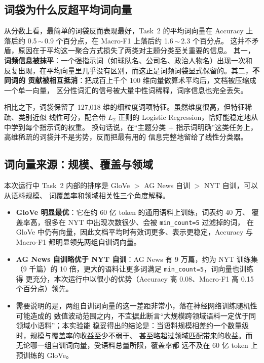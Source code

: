 \documentclass[a4paper]{article}
\begin{document}
\subsection{词袋为什么反超平均词向量}

从分数上看，最简单的词袋反而表现最好，Task~2 的平均词向量在 Accuracy 上落后约
0.5\,$\sim$\,0.9 个百分点，在 Macro-F1 上落后约 1.6\,$\sim$\,2.3 个百分点。
这并不矛盾，原因在于平均这一聚合方式损失了两类对主题分类至关重要的信息。
其一，\textbf{词频信息被抹平}：一个强指示词（如球队名、公司名、政治人物名）出现一次和
反复出现，在平均向量里几乎没有区别，而这正是词频词袋显式保留的。其二，\textbf{不同词的
贡献被相互抵消}：把成百上千个 100 维向量做算术平均后，文档被压缩成一个单一向量，
区分性词汇的信号被大量中性词稀释，词序信息也完全丢失。

相比之下，词袋保留了 127{,}018 维的细粒度词项特征。虽然维度很高，但特征稀疏、类别近似
线性可分，配合带 $L_2$ 正则的 Logistic Regression，恰好能稳定地从中学到每个指示词的权重。
换句话说，在“主题分类 + 指示词明确”这类任务上，高维稀疏的词袋并不是劣势，反而把最有用的
信息完整地留给了线性分类器。

\subsection{词向量来源：规模、覆盖与领域}

本次运行中 Task~2 内部的排序是 GloVe $>$ AG News 自训 $>$ NYT 自训，可以从语料规模、
词覆盖率和领域相关性三个角度解释。
\begin{itemize}
  \item \textbf{GloVe 明显最优}：它在约 60 亿 token 的通用语料上训练，词表约 40 万、
        覆盖率高，很多在 NYT 中出现次数很少、会被 \texttt{min\_count=5} 过滤掉的词，
        在 GloVe 中仍有向量，因此文档平均时有效词更多、表示更稳定，Accuracy 与 Macro-F1
        都明显领先两组自训词向量。
  \item \textbf{AG News 自训略优于 NYT 自训}：AG News 有 9 万篇，约为 NYT 训练集
        （9 千篇）的 10 倍，更大的语料让更多词满足 \texttt{min\_count=5}，词向量也训练得
        更充分，本次运行中以很小的优势（Accuracy 高 0.08、Macro-F1 高 0.15 个百分点）领先。
  \item 需要说明的是，两组自训词向量的这一差距非常小，落在神经网络训练随机性可能造成的
        数值波动范围之内，不宜据此断言“大规模跨领域语料一定优于同领域小语料”；本实验能
        稳妥得出的结论是：当语料规模相差约一个数量级时，规模与覆盖率的收益至少不弱于、
        甚至略超过领域匹配带来的收益。而无论哪一组自训词向量，受语料总量所限，覆盖率都
        远不及在 60 亿 token 上预训练的 GloVe。
\end{itemize}
\end{document}
